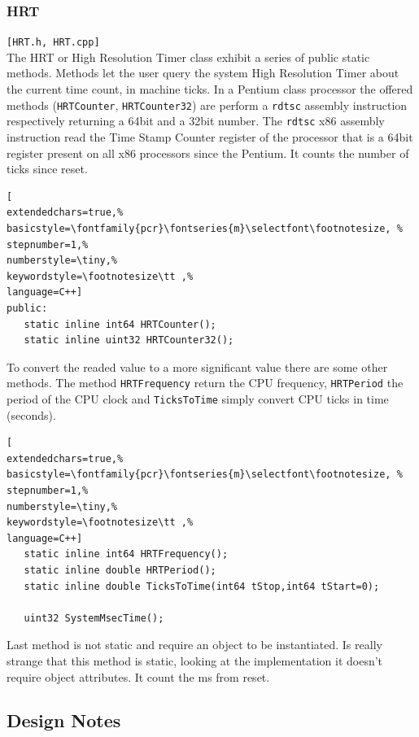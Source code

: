 \subsubsection{HRT}
\texttt{[HRT.h, HRT.cpp]}\\
The HRT or High Resolution Timer class exhibit a series of public static methods. Methods let the user query the system High Resolution Timer about the current time count, in machine ticks. In a Pentium class processor the offered methods (\texttt{HRTCounter}, \texttt{HRTCounter32}) are perform a \texttt{rdtsc} assembly instruction respectively returning a 64bit and a 32bit number. The \texttt{rdtsc} x86 assembly instruction read the Time Stamp Counter register of the processor that is a 64bit register present on all x86 processors since the Pentium. It counts the number of ticks since reset.

\begin{lstlisting}[
extendedchars=true,%
basicstyle=\fontfamily{pcr}\fontseries{m}\selectfont\footnotesize, %
stepnumber=1,%
numberstyle=\tiny,%
keywordstyle=\footnotesize\tt ,%
language=C++]
public:
   static inline int64 HRTCounter();
   static inline uint32 HRTCounter32();
\end{lstlisting}

To convert the readed value to a more significant value there are some other methods. The method \texttt{HRTFrequency} return the CPU frequency, \texttt{HRTPeriod} the period of the CPU clock and \texttt{TicksToTime} simply convert CPU ticks in time (seconds).

\begin{lstlisting}[
extendedchars=true,%
basicstyle=\fontfamily{pcr}\fontseries{m}\selectfont\footnotesize, %
stepnumber=1,%
numberstyle=\tiny,%
keywordstyle=\footnotesize\tt ,%
language=C++]
   static inline int64 HRTFrequency();
   static inline double HRTPeriod();
   static inline double TicksToTime(int64 tStop,int64 tStart=0);

   uint32 SystemMsecTime();
\end{lstlisting}

Last method is not static and require an object to be instantiated. Is really strange that this method is static, looking at the implementation it doesn't require object attributes. It count the ms from reset.



\subsection{Design Notes}

